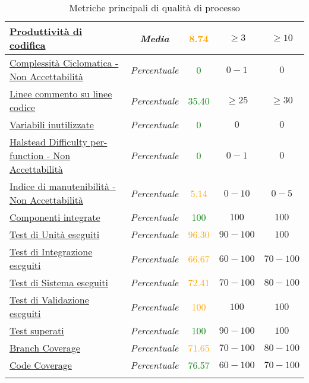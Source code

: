 \begin{longtable}{|>{\centering}m{5cm}|c|c|c|c|}
\hyperref[prodCod]{Produttività di codifica} & \textit{Media} & \textcolor{Orange}{8.74} & $\geq 3$ & $\geq 10$\\ \hline
\hyperref[complCiclomNA]{Complessità Ciclomatica - Non Accettabilità} & \textit{Percentuale} & \textcolor{Green}{0} & $0 - 1$ & $0$\\ \hline
\hyperref[lineeCommento]{Linee commento su linee codice} & \textit{Percentuale} & \textcolor{Green}{35.40} & $\geq 25$ & $\geq 30$\\ \hline
\hyperref[variabInutilizz]{Variabili inutilizzate} & \textit{Percentuale} & \textcolor{Green}{0} & $0$ & $0$\\ \hline
\hyperref[halDiffNA]{Halstead Difficulty per-function - Non Accettabilità} & \textit{Percentuale} & \textcolor{Green}{0} & $0 - 1$ & $0$\\ \hline
\hyperref[indManNA]{Indice di manutenibilità - Non Accettabilità} & \textit{Percentuale} & \textcolor{Orange}{5.14} & $0 - 10$ & $0 - 5$\\ \hline
\hyperref[compInt]{Componenti integrate} & \textit{Percentuale} & \textcolor{Green}{100} & $100$ & $100$\\ \hline
\hyperref[tuniese]{Test di Unità eseguiti} & \textit{Percentuale} & \textcolor{Orange}{96.30} & $90 - 100$ & $100$\\ \hline
\hyperref[tintese]{Test di Integrazione eseguiti} & \textit{Percentuale} & \textcolor{Orange}{66.67} & $60 - 100$ & $70 - 100$\\ \hline
\hyperref[tsissup]{Test di Sistema eseguiti} & \textit{Percentuale} & \textcolor{Orange}{72.41} & $70 - 100$ & $80 - 100$\\ \hline
\hyperref[tvalese]{Test di Validazione eseguiti} & \textit{Percentuale} & \textcolor{Orange}{100} & $100$ & $100$\\ \hline
\hyperref[tsuperati]{Test superati} & \textit{Percentuale} & \textcolor{Green}{100} & $90 - 100$ & $100$\\ \hline
\hyperref[coperturaTest]{Branch Coverage} & \textit{Percentuale} & \textcolor{Orange}{71.65} & $70 - 100$ & $80 - 100$\\ \hline
\hyperref[codeCoverage]{Code Coverage} & \textit{Percentuale} & \textcolor{Green}{76.57} & $60 - 100$ & $70 - 100$\\ \hline
\caption[Metriche principali di qualità di processo]{Metriche principali di qualità di processo}
\end{longtable}
